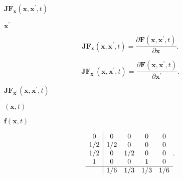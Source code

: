 \documentclass{article}
\begin{document}
$ \mathbf{JF}_{\mathbf{x}}(\mathbf{x}, \mathbf{x}^{\prime}, t) $
\pagebreak

$ \mathbf{x}^{\prime} $
\pagebreak

\[
  \mathbf{JF}_{\mathbf{x}}(\mathbf{x}, \mathbf{x}^{\prime}, t) =
  \dfrac{\partial\mathbf{F}(\mathbf{x}, \mathbf{x}^{\prime}, t)}{\partial\mathbf{x}} \text{.}
\]
\pagebreak

\[
  \mathbf{JF}_{\mathbf{x}^{\prime}}(\mathbf{x}, \mathbf{x}^{\prime}, t) =
  \dfrac{\partial\mathbf{F}(\mathbf{x}, \mathbf{x}^{\prime}, t)}{\partial\mathbf{x}^{\prime}} \text{.}
\]
\pagebreak

$ \mathbf{JF}_{\mathbf{x}^{\prime}}(\mathbf{x}, \mathbf{x}^{\prime}, t) $
\pagebreak

$ (\mathbf{x}, t) $
\pagebreak

$ \mathbf{f}(\mathbf{x}, t) $
\pagebreak

\[
\begin{array}{c|cccc}
    0 &   0 &   0 &   0 &   0 \\
  1/2 & 1/2 &   0 &   0 &   0 \\
  1/2 &   0 & 1/2 &   0 &   0 \\
    1 &   0 &   0 &   1 &   0 \\
  \hline
      & 1/6 & 1/3 & 1/3 & 1/6
\end{array} \text{.}
\]
\pagebreak
\end{document}
